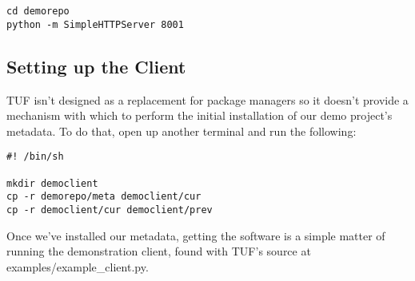 \documentclass{article}
\begin{document}
\begin{lstlisting}
cd demorepo
python -m SimpleHTTPServer 8001
\end{lstlisting}

\subsection{Setting up the Client}
TUF isn't designed as a replacement for package managers so it doesn't provide
a mechanism with which to perform the initial installation of our demo project's
metadata. To do that, open up another terminal and run the following:

\begin{lstlisting}
#! /bin/sh

mkdir democlient
cp -r demorepo/meta democlient/cur
cp -r democlient/cur democlient/prev
\end{lstlisting}


Once we've installed our metadata, getting the software is a simple matter of 
running the demonstration client, found with TUF's source at 
examples/example\_client.py.
\end{document}
